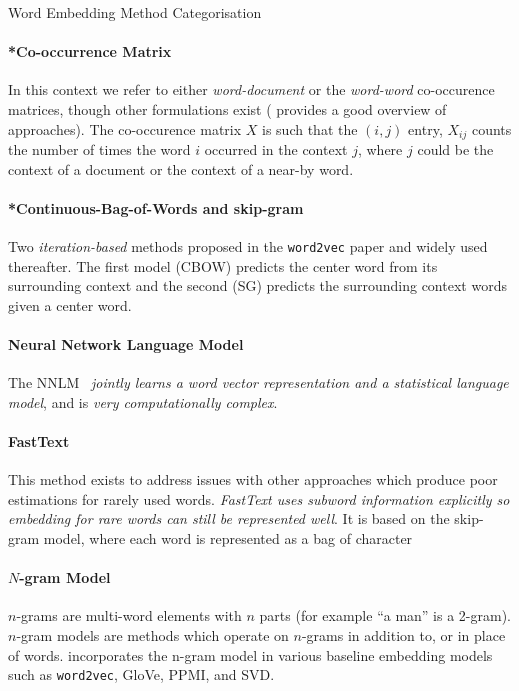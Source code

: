 \documentclass{ucetd}
\begin{document}
\begin{infobox}{Word Embedding Method Categorisation}
  \paragraph{*Co-occurrence Matrix} In this context we refer to either \emph{word-document} or the \emph{word-word} co-occurence matrices, though other formulations exist (\textcite{turney10-from-frequen-to-meanin} provides a good overview of approaches). The co-occurence matrix $X$ is such that the $(i, j)$ entry, $X_{ij}$ counts the number of times the word $i$ occurred in the context $j$, where $j$ could be the context of a document or the context of a near-by word.
  \paragraph{*Continuous-Bag-of-Words and skip-gram} Two \emph{iteration-based} methods proposed in the \texttt{word2vec} paper \parencite{mikolov13-effic-estim-word-repres-vector-space} and widely used thereafter. The first model (CBOW) predicts the center word from its surrounding context and the second (SG) predicts the surrounding context words given a center word.
  \paragraph{Neural Network Language Model} The NNLM~\parencite{bengio-2003-a-neural-prob-lang-model} \emph{jointly learns a word vector representation and a statistical language model}, and is \emph{very computationally complex}.
  \paragraph{FastText} This method exists to address issues with other approaches which produce poor estimations for rarely used words. \emph{FastText uses subword information explicitly so embedding for rare words can still be represented well}. It is based on the skip-gram model, where each word is represented as a bag of character 
  \paragraph{$N$-gram Model} $n$-grams are multi-word elements with $n$ parts (for example ``a man'' is a 2-gram). $n$-gram models are methods which operate on $n$-grams in addition to, or in place of words. \textcite{zhao-etal-2017-ngram2vec} incorporates the n-gram model in various baseline embedding models such as \texttt{word2vec}, GloVe, PPMI, and SVD.

\end{infobox}
\end{document}
